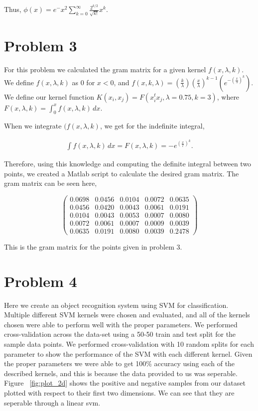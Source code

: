 \documentclass[paper=a4, fontsize=11pt]{scrartcl} %
\begin{document}
Thus, $\phi(x) = e^-x^2\sum \limits_{k=0}^\infty \frac{2^{k/2}}{\sqrt{k!}}x^k$.

\section{Problem 3}

For this problem we calculated the gram matrix for a given kernel $f(x,\lambda,k)$.
We define $f(x,\lambda,k)$ as $0$ for $x < 0$, and $f(x,k,\lambda)=(\frac{k}{\lambda})(\frac{x}{\lambda})^{k-1}(e^{-(\frac{x}{\lambda})^k})$.
We define our kernel function $K(x_i,x_j) = F(x_i^tx_j,\lambda=0.75,k=3)$, where $F(x,\lambda,k) =\int^x_0 f(x,\lambda,k)\,dx$. 

When we integrate $(f(x,\lambda,k)$, we get for the indefinite integral, 

\begin{align}
\int f(x,\lambda,k) \,dx = F(x,\lambda,k) = -e^{(\frac{x}{l})^k}.
\end{align}

Therefore, using this knowledge and computing the definite integral between two points, we created a Matlab script to calculate the desired gram matrix.
The gram matrix can be seen here, 

\[ \left( \begin{array}{ccccc}
0.0698 & 0.0456 & 0.0104 & 0.0072 & 0.0635 \\
0.0456 & 0.0420 & 0.0043 & 0.0061 & 0.0191 \\
0.0104 & 0.0043 & 0.0053 & 0.0007 & 0.0080 \\
0.0072 & 0.0061 & 0.0007 & 0.0009 & 0.0039 \\
0.0635 & 0.0191 & 0.0080 & 0.0039 & 0.2478\end{array} \right)\] 

This is the gram matrix for the points given in problem 3.

\section{Problem 4}

Here we create an object recognition system using SVM for classification.
Multiple different SVM kernels were chosen and evaluated, and all of the kernels chosen were able to perform well with the proper parameters.  
We performed cross-validation across the data-set using a 50-50 train and test split for the sample data points.
We performed cross-validation with 10 random splits for each parameter to show the performance of the SVM with each different kernel.
Given the proper parameters we were able to get 100\% accuracy using each of the described kernels, and this is because the data provided to us was seperable.  
Figure ~\ref{fig:plot_2d} shows the positive and negative samples from our dataset plotted with respect to their first two dimensions.
We can see that they are seperable through a linear svm.
\end{document}
